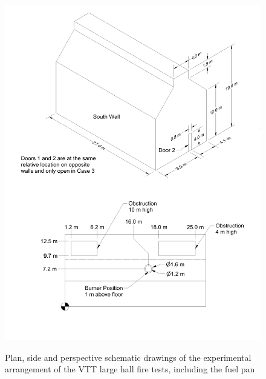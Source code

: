 \begin{figure}[\figoptions{b}]
\begin{center}
\includegraphics[width=6.5in]{FIGURES/VTT/VTT_Drawing}\\
\end{center}
\caption{Plan, side and perspective schematic drawings of the experimental arrangement of the VTT large hall fire tests, including the fuel pan}
 \label{fig:VTT_Schematic}
\end{figure}

